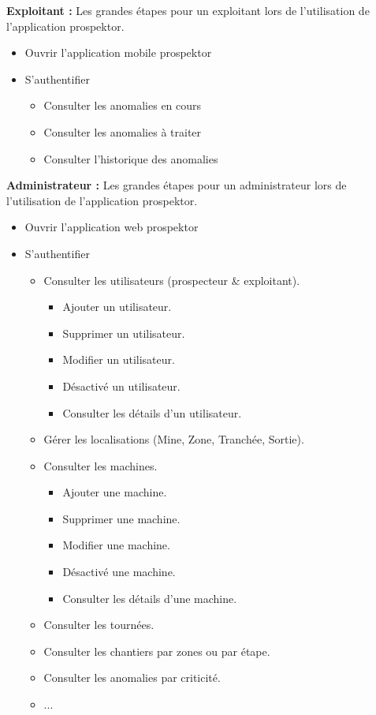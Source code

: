 \textbf{Exploitant :} Les grandes \'etapes pour un exploitant lors de l'utilisation de l'application prospektor.
\begin{itemize}
  \item Ouvrir l'application mobile prospektor
  \item S'authentifier
  \begin{itemize}
    \item Consulter les anomalies en cours
    \item Consulter les anomalies \`a traiter
    \item Consulter l'historique des anomalies
  \end{itemize}
\end{itemize}

\textbf{Administrateur :} Les grandes \'etapes pour un administrateur lors de l'utilisation de l'application prospektor.
\begin{itemize}
  \item Ouvrir l'application web prospektor
  \item S'authentifier
  \begin{itemize}
    \item Consulter les utilisateurs (prospecteur \& exploitant).
    \begin{itemize}
    \item Ajouter un utilisateur.
    \item Supprimer un utilisateur.
    \item Modifier un utilisateur.
    \item D\'esactiv\'e un utilisateur.
    \item Consulter les d\'etails d'un utilisateur.
    \end{itemize}
    \item G\'erer les localisations (Mine, Zone, Tranch\'ee, Sortie).
    \item Consulter les machines.
    \begin{itemize}
    \item Ajouter une machine.
    \item Supprimer une machine.
    \item Modifier une machine.
    \item D\'esactiv\'e une machine.
    \item Consulter les d\'etails d'une machine.
    \end{itemize}
    \item Consulter les tourn\'ees.
    \item Consulter les chantiers par zones ou par \'etape.
    \item Consulter les anomalies par criticit\'e.
    \item ...

  \end{itemize}
\end{itemize}

